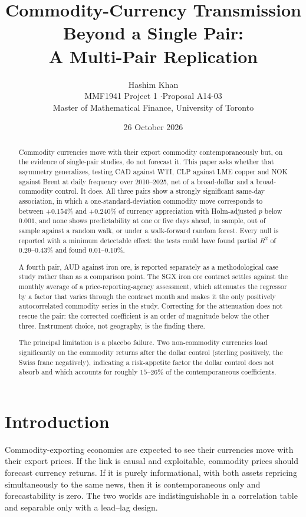 \documentclass[11pt,a4paper]{article}
\title{\textbf{Commodity-Currency Transmission Beyond a Single Pair:\\
A Multi-Pair Replication}}
\author{Hashim Khan\\
\small MMF1941 Project 1 \quad$\cdot$\quad Proposal A14-03\\
\small Master of Mathematical Finance, University of Toronto}
\date{26 October 2026}
\begin{document}
\maketitle

\begin{abstract}
\noindent
Commodity currencies move with their export commodity contemporaneously but, on
the evidence of single-pair studies, do not forecast it. This paper asks whether
that asymmetry generalizes, testing CAD against WTI, CLP against LME copper and
NOK against Brent at daily frequency over 2010--2025, net of a broad-dollar and
a broad-commodity control. It does. All three pairs show a strongly significant
same-day association, in which a one-standard-deviation commodity move
corresponds to between $+0.154\%$ and $+0.240\%$ of currency appreciation with
Holm-adjusted $p$ below $0.001$, and none shows predictability at one or five
days ahead,
in sample, out of sample against a random walk, or under a walk-forward random
forest. Every null is reported with a minimum detectable effect: the tests could
have found partial $R^2$ of $0.29$--$0.43\%$ and found $0.01$--$0.10\%$.

A fourth pair, AUD against iron ore, is reported separately as a methodological
case study rather than as a comparison point. The SGX iron ore contract settles
against the monthly average of a price-reporting-agency assessment, which
attenuates the regressor by a factor that varies through the contract month and
makes it the only positively autocorrelated commodity series in the study.
Correcting for the attenuation does not rescue the pair: the corrected
coefficient is an order of magnitude below the other three. Instrument choice,
not geography, is the finding there.

The principal limitation is a placebo failure. Two non-commodity currencies load
significantly on the commodity returns after the dollar control (sterling
positively, the Swiss franc negatively), indicating a risk-appetite factor the
dollar control does not absorb and which accounts for roughly $15$--$26\%$ of
the contemporaneous coefficients.
\end{abstract}

\section{Introduction}

Commodity-exporting economies are expected to see their currencies move with
their export prices. If the link is causal and exploitable, commodity prices
should forecast currency returns. If it is purely informational, with both
assets repricing simultaneously to the same news, then it is contemporaneous
only and
forecastability is zero. The two worlds are indistinguishable in a correlation
table and separable only with a lead--lag design.
\end{document}
